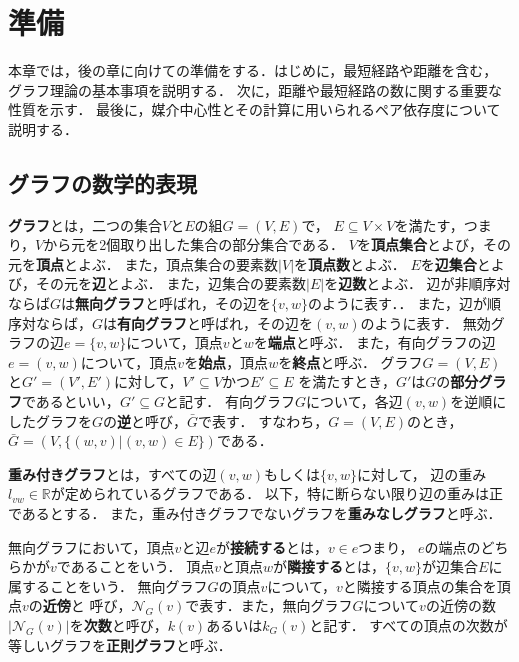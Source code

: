 \chapter{準備}
\label{chap:preliminary}
本章では，後の章に向けての準備をする．はじめに，最短経路や距離を含む，
グラフ理論の基本事項を説明する．
次に，距離や最短経路の数に関する重要な性質を示す．
最後に，媒介中心性とその計算に用いられるペア依存度について説明する．

\section{グラフの数学的表現}
\label{sect:graph-theory}

\textbf{グラフ}とは，二つの集合$V$と$E$の組$G=(V,E)$で，
$E\subseteq V\times V$を満たす，つまり，$V$から元を2個取り出した集合の部分集合である．
$V$を\textbf{頂点集合}とよび，その元を\textbf{頂点}とよぶ．
また，頂点集合の要素数$|V|$を\textbf{頂点数}とよぶ．
$E$を\textbf{辺集合}とよび，その元を\textbf{辺}とよぶ．
また，辺集合の要素数$|E|$を\textbf{辺数}とよぶ．
辺が非順序対ならば$G$は\textbf{無向グラフ}と呼ばれ，その辺を$\{v,w\}$のように表す．．
また，辺が順序対ならば，$G$は\textbf{有向グラフ}と呼ばれ，その辺を$(v,w)$のように表す．
無効グラフの辺$e=\{v,w\}$について，頂点$v$と$w$を\textbf{端点}と呼ぶ．
また，有向グラフの辺$e=(v,w)$について，頂点$v$を\textbf{始点}，頂点$w$を\textbf{終点}と呼ぶ．
グラフ$G=(V,E)$と$G'=(V',E')$に対して，$V'\subseteq V$かつ$E'\subseteq E$
を満たすとき，$G'$は$G$の\textbf{部分グラフ}であるといい，$G'\subseteq G$と記す．
有向グラフ$G$について，各辺$(v,w)$を逆順にしたグラフを$G$の\textbf{逆}と呼び，$\bar{G}$で表す．
すなわち，$G=(V,E)$のとき，$\bar{G}=(V,\{(w,v)|(v,w)\in E\})$である．

\textbf{重み付きグラフ}とは，すべての辺$(v,w)$もしくは$\{v,w\}$に対して，
辺の重み$l_{vw}\in\mathbb{R}$が定められているグラフである．
以下，特に断らない限り辺の重みは正であるとする．
また，重み付きグラフでないグラフを\textbf{重みなしグラフ}と呼ぶ．

無向グラフにおいて，頂点$v$と辺$e$が\textbf{接続する}とは，$v\in e$つまり，
$e$の端点のどちらかが$v$であることをいう．
頂点$v$と頂点$w$が\textbf{隣接する}とは，$\{v,w\}$が辺集合$E$に属することをいう．
無向グラフ$G$の頂点$v$について，$v$と隣接する頂点の集合を頂点$v$の\textbf{近傍}と
呼び，$\mathcal{N}_G(v)$で表す．また，無向グラフ$G$について$v$の近傍の数
$|\mathcal{N}_G(v)|$を\textbf{次数}と呼び，$k(v)$あるいは$k_G(v)$と記す．
すべての頂点の次数が等しいグラフを\textbf{正則グラフ}と呼ぶ．

